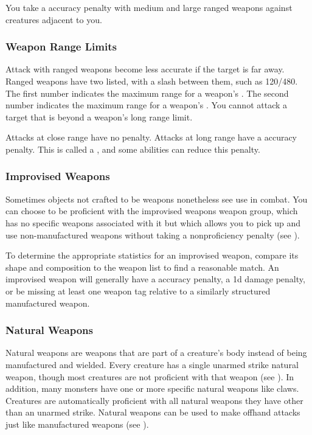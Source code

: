                 You take a  accuracy penalty with medium and large ranged weapons against creatures adjacent to you.

        \subsubsection{Weapon Range Limits}\label{Weapon Range Limits}
            Attack with ranged weapons become less accurate if the target is far away.
            Ranged weapons have two  listed, with a slash between them, such as 120/480.
            The first number indicates the maximum range for a weapon's .
            The second number indicates the maximum range for a weapon's .
            You cannot attack a target that is beyond a weapon's long range limit.

            Attacks at close range have no penalty.
            Attacks at long range have a  accuracy penalty.
            This is called a , and some abilities can reduce this penalty.

        \subsubsection{Improvised Weapons}\label{Improvised Weapons}
            Sometimes objects not crafted to be weapons nonetheless see use in combat.
            You can choose to be proficient with the improvised weapons weapon group, which has no specific weapons associated with it but which allows you to pick up and use non-manufactured weapons without taking a nonproficiency penalty (see ).

            To determine the appropriate statistics for an improvised weapon, compare its shape and composition to the weapon list to find a reasonable match.
            An improvised weapon will generally have a  accuracy penalty, a \minus1d damage penalty, or be missing at least one weapon tag relative to a similarly structured manufactured weapon.

        \subsubsection{Natural Weapons}\label{Natural Weapons}
            Natural weapons are weapons that are part of a creature's body instead of being manufactured and wielded.
            Every creature has a single unarmed strike natural weapon, though most creatures are not proficient with that weapon (see ).
            In addition, many monsters have one or more specific natural weapons like claws.
            Creatures are automatically proficient with all natural weapons they have other than an unarmed strike.
            Natural weapons can be used to make offhand attacks just like manufactured weapons (see ).

